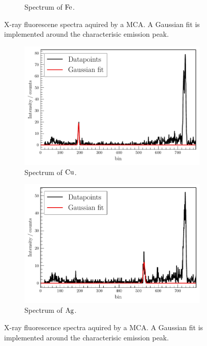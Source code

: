 \begin{figure}
\begin{subfigure}{.3\textwidth}
  \caption{Spectrum of $\ce{Fe}$.}
\end{subfigure}
\caption{X-ray fluorescene spectra aquired by a MCA. A Gaussian fit is implemented around the characterisic emission peak.}
\label{fig:scaling-samplesA}
\end{figure}

\begin{figure}
    \centering
\begin{subfigure}{.45\textwidth}
    \centering
    \includegraphics[width=\textwidth]{plots/Cu-spectrum.pdf}
    \caption{Spectrum of $\ce{Cu}$.}
\end{subfigure}
\begin{subfigure}{.45\textwidth}
    \includegraphics[width=\textwidth]{plots/Ag-spectrum.pdf}
  \caption{Spectrum of $\ce{Ag}$.}
\end{subfigure}
\caption{X-ray fluorescence spectra aquired by a MCA. A Gaussian fit is implemented around the characterisic emission peak.}
\label{fig:scaling-samplesB}
\end{figure}

